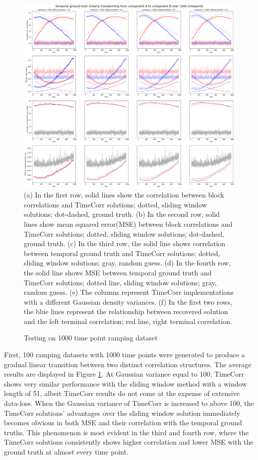 \documentclass[11pt]{article}
\begin{document}
\begin{figure}[!htb]
\caption{Testing on 1000 time point ramping dataset}
\includegraphics[width=1\textwidth]{../figures/SyntheticTesting/ramp1000t4var.png}
\label{fig:ramp1000t4var}
(a) In the first row, solid lines show the correlation between block correlations and TimeCorr solutions; dotted, sliding window solutions; dot-dashed, ground truth. (b) In the second row, solid lines show mean squared error(MSE) between block correlations and TimeCorr solutions; dotted, sliding window solutions; dot-dashed, ground truth. (c) In the third row, the solid line shows correlation between temporal ground truth and TimeCorr solutions; dotted, sliding window solutions; gray, random guess. (d) In the fourth row, the solid line shows MSE between temporal ground truth and TimeCorr solutions; dotted line, sliding window solutions; gray, random guess. (e) The columns represent TimeCorr implementations with a different Gaussian density variances. (f) In the first two rows, the blue lines represent the relationship between recovered solution and the left terminal correlation; red line, right terminal correlation.
\end{figure}

First, 100 ramping datasets with 1000 time points were generated to produce a gradual linear transition between two distinct correlation structures. The average results are displayed in Figure \ref{fig:ramp1000t4var}. At Gaussian variance equal to 100, TimeCorr shows very similar performance with the sliding window method with a window length of 51, albeit TimeCorr results do not come at the expense of extensive data-loss. When the Gaussian variance of TimeCorr is increased to above 100, the TimeCorr solutions' advantages over the sliding window solution immediately becomes obvious in both MSE and their correlation with the temporal ground truths. This phenomenon is most evident in the third and fourth row, where the TimeCorr solutions consistently shows higher correlation and lower MSE with the ground truth at almost every time point.
\end{document}

